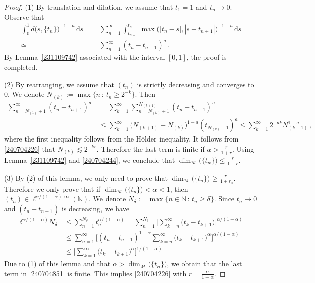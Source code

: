 \documentclass[11pt]{amsart}
\theoremstyle{plain}
\theoremstyle{definition}
\theoremstyle{remark}
\numberwithin{equation}{section}
\newcommand{\cM}{\mathcal{M}}
\newcommand{\bN}{\mathbb{N}}
\newcommand{\dd}{\,\mathrm{d}}
\begin{document}
\begin{proof}
(1) By translation and dilation, we assume that $t_1=1$ and $t_n\rightarrow 0$.
    Observe that
    \begin{align}
        \int_0^1 d\big(s,\{t_n\}\big)^{-1+a}\dd s = \,&\sum_{n=1}^\infty\int_{t_{n+1}}^{t_n}\max\big(|t_n-s|,|s-t_{n+1}|\big)^{-1+a}\dd s\nonumber\\
        \simeq \,&\sum_{n=1}^\infty(t_n-t_{n+1})^a\,.\label{240704244}
    \end{align}
    By Lemma~\ref{231109742} associated with the interval $[0,1]$, the proof is completed.


(2)
By rearranging, we assume that $(t_n)$ is strictly decreasing and converges to $0$.
    We denote $N_{(k)}:=\max\{n\,:\,t_n\geq 2^{-k}\}$.
    Then
    \begin{align*}
    \sum_{n=N_{(1)}+1}^\infty(t_{n}-t_{n+1})^a\,&=\sum_{k=1}^\infty\sum_{n=N_{(k)}+1}^{N_{(k+1)}}(t_n-t_{n+1})^a\\
    &\leq \sum_{k=1}^\infty\big(N_{(k+1)}-N_{(k)}\big)^{1-a}(t_{N_{(k)}+1})^a\leq \sum_{k=1}^\infty 2^{-ak}N_{(k+1)}^{1-a}\,,
    \end{align*}
    where the first inequality follows from the H\"older inequality.
It follows from \eqref{240704226} that $N_{(k)}\lesssim 2^{-kr}$.
Therefore the last term is finite if $a>\frac{r}{1+r}$.
Using Lemma~\ref{231109742} and \eqref{240704244}, we conclude that $\dim_{\cM}\big(\{t_n\}\big)\leq \frac{r}{1+r}$.

(3) By (2) of this lemma, we only need to prove that  $\dim_{\cM}\big(\{t_n\}\big)\geq \frac{r_0}{1+r_0}$.
Therefore we only prove that if $\dim_{\cM}\big(\{t_n\}\big)<\alpha<1$, then $(t_n)\in\ell^{\alpha/(1-\alpha),\infty}(\bN)$.
We denote $N_\delta:=\max\big\{n\in\bN\,:\,t_n\geq \delta\big\}$.
Since $t_n\rightarrow 0$ and $(t_n-t_{n+1})$ is decreasing, we have
\begin{align}
\delta^{\alpha/(1-\alpha)}N_\delta \,&\leq \sum_{n=1}^{N_\delta}t_n^{\alpha/(1-\alpha)}=\sum_{n=1}^{N_\delta}\bigg[\sum_{k=n}^\infty \big(t_k-t_{k+1}\big)\bigg]^{\alpha/(1-\alpha)}\nonumber\\
&\leq \sum_{n=1}^{\infty}\bigg[(t_n-t_{n+1})^{1-\alpha}\sum_{k=n}^\infty \big(t_k-t_{k+1}\big)^\alpha\bigg]^{\alpha/(1-\alpha)}\label{240704851}\\
&\leq \bigg[\sum_{k=1}^\infty \big(t_k-t_{k+1}\big)^\alpha\bigg]^{1/(1-\alpha)}\nonumber
\end{align}
Due to (1) of this lemma and that $\alpha>\dim_{\cM}\big(\{t_n\}\big)$, we obtain that the last term in \eqref{240704851} is finite.
This implies \eqref{240704226} with $r=\frac{\alpha}{1-\alpha}$.
\end{proof}
\end{document}
